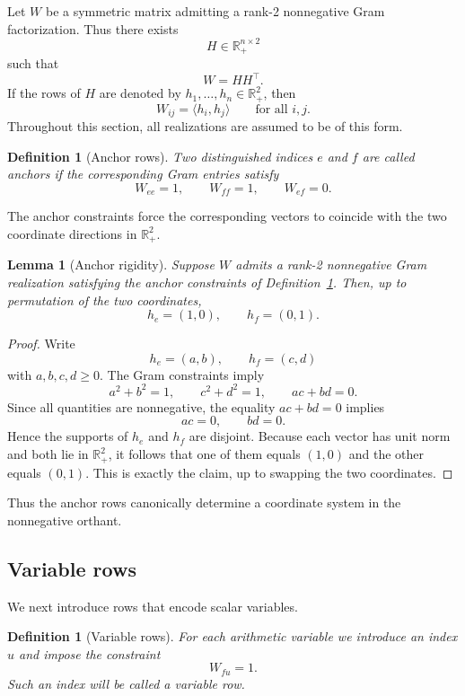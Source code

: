 \documentclass[11pt]{article}
\newtheorem{lemma}[theorem]{Lemma}
\newtheorem{definition}[theorem]{Definition}
\begin{document}
Let $W$ be a symmetric matrix admitting a rank-2 nonnegative Gram
factorization. Thus there exists
\[
H \in \mathbb{R}_+^{n\times 2}
\]
such that
\[
W = HH^\top.
\]
If the rows of $H$ are denoted by $h_1,\dots,h_n \in \mathbb{R}_+^2$, then
\[
W_{ij} = \langle h_i,h_j\rangle
\qquad \text{for all } i,j.
\]
Throughout this section, all realizations are assumed to be of this form.

\begin{definition}[Anchor rows]
\label{def:anchors}
Two distinguished indices $e$ and $f$ are called \emph{anchors} if the
corresponding Gram entries satisfy
\[
W_{ee}=1,\qquad W_{ff}=1,\qquad W_{ef}=0.
\]
\end{definition}

The anchor constraints force the corresponding vectors to coincide with the
two coordinate directions in $\mathbb{R}_+^2$.

\begin{lemma}[Anchor rigidity]
\label{lem:anchor-rigidity}
Suppose $W$ admits a rank-2 nonnegative Gram realization satisfying the anchor
constraints of Definition~\ref{def:anchors}. Then, up to permutation of the
two coordinates,
\[
h_e=(1,0),\qquad h_f=(0,1).
\]
\end{lemma}

\begin{proof}
Write
\[
h_e=(a,b),\qquad h_f=(c,d)
\]
with $a,b,c,d\ge 0$. The Gram constraints imply
\[
a^2+b^2 = 1,\qquad c^2+d^2 = 1,\qquad ac+bd = 0.
\]
Since all quantities are nonnegative, the equality $ac+bd=0$ implies
\[
ac=0,\qquad bd=0.
\]
Hence the supports of $h_e$ and $h_f$ are disjoint. Because each vector has
unit norm and both lie in $\mathbb{R}_+^2$, it follows that one of them equals
$(1,0)$ and the other equals $(0,1)$. This is exactly the claim, up to
swapping the two coordinates.
\end{proof}

Thus the anchor rows canonically determine a coordinate system in the
nonnegative orthant.

\subsection{Variable rows}

We next introduce rows that encode scalar variables.

\begin{definition}[Variable rows]
\label{def:variable-rows}
For each arithmetic variable we introduce an index $u$ and impose the
constraint
\[
W_{fu}=1.
\]
Such an index will be called a \emph{variable row}.
\end{definition}
\end{document}
